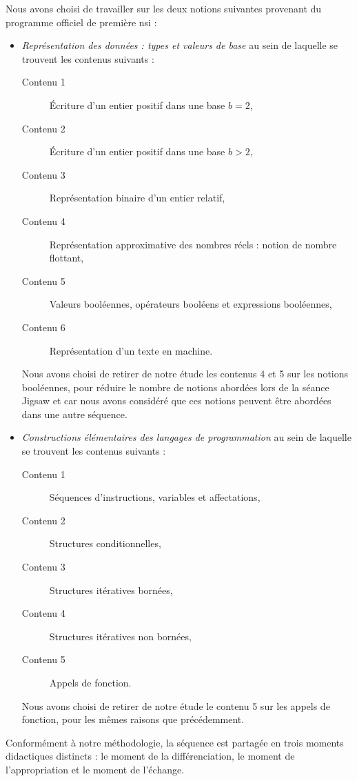 Nous avons choisi de travailler sur les deux notions suivantes provenant du programme officiel de première \gls{nsi} :
\begin{itemize}
	\item \emph{Représentation des données : types et valeurs de base} au sein de laquelle se trouvent les contenus suivants :
	\begin{description}
	    \item[Contenu 1] Écriture d'un entier positif dans une base $b=2$,
	    \item[Contenu 2] Écriture d'un entier positif dans une base $b>2$,
	    \item[Contenu 3] Représentation binaire d'un entier relatif,
	    \item[Contenu 4] Représentation approximative des nombres réels : notion de nombre flottant,
	    \item[Contenu 5] Valeurs booléennes, opérateurs booléens et expressions booléennes,
	    \item[Contenu 6] Représentation d'un texte en machine.
	\end{description}
	Nous avons choisi de retirer de notre étude les contenus 4 et 5 sur les notions booléennes, pour réduire le nombre de notions abordées lors de la séance Jigsaw et car nous avons considéré que ces notions peuvent être abordées dans une autre séquence.
	\item \emph{Constructions élémentaires des langages de programmation} au sein de laquelle se trouvent les contenus suivants :
	\begin{description}
	    \item[Contenu 1] Séquences d'instructions, variables et affectations,
	    \item[Contenu 2] Structures conditionnelles,
	    \item[Contenu 3] Structures itératives bornées,
	    \item[Contenu 4] Structures itératives non bornées,
	    \item[Contenu 5] Appels de fonction.
	\end{description}
	Nous avons choisi de retirer de notre étude le contenu 5 sur les appels de fonction, pour les mêmes raisons que précédemment.
\end{itemize}

Conformément à notre méthodologie, la séquence est partagée en trois moments didactiques distincts : le moment de la différenciation, le moment de l'appropriation et le moment de l'échange. 

